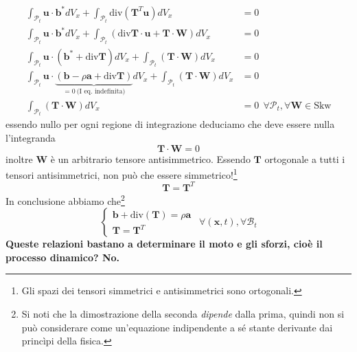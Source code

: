 \documentclass[10pt,a4paper,twoside]{book}
\begin{document}
\begin{equation*}
\begin{aligned}
\int _{\mathcal{P}_{t}}\mathbf{u} \cdotp \mathbf{b}^{*} dV_{x} +\int _{\mathcal{P}_{t}}\mathrm{div}\left(\mathbf{T}^{T}\mathbf{u}\right) dV_{x} & =0\\
\int _{\mathcal{P}_{t}}\mathbf{u} \cdotp \mathbf{b}^{*} dV_{x} +\int _{\mathcal{P}_{t}}(\mathrm{div}\mathbf{T} \cdotp \mathbf{u} +\mathbf{T} \cdotp \mathbf{W}) dV_{x} & =0\\
\int _{\mathcal{P}_{t}}\mathbf{u} \cdotp \left(\mathbf{b}^{*} +\mathrm{div}\mathbf{T}\right) dV_{x} +\int _{\mathcal{P}_{t}}(\mathbf{T} \cdotp \mathbf{W}) dV_{x} & =0\\
\int _{\mathcal{P}_{t}}\mathbf{u} \cdotp \underbrace{(\mathbf{b} -\rho \mathbf{a} +\mathrm{div}\mathbf{T})}_{=0\ \text{(I eq. indefinita)}} dV_{x} +\int _{\mathcal{P}_{t}}(\mathbf{T} \cdotp \mathbf{W}) dV_{x} & =0\\
\int _{\mathcal{P}_{t}}(\mathbf{T} \cdotp \mathbf{W}) dV_{x} & =0\ \ \forall \mathcal{P}_{t} ,\forall \mathbf{W} \in \mathrm{Skw}
\end{aligned}
\end{equation*}
essendo nullo per ogni regione di integrazione deduciamo che deve essere nulla l'integranda
\begin{equation*}
\mathbf{T} \cdotp \mathbf{W} =0
\end{equation*}
inoltre $\mathbf{W}$ è un arbitrario tensore antisimmetrico. Essendo $\mathbf{T}$ ortogonale a tutti i tensori antisimmetrici, non può che essere simmetrico!\footnote{Gli spazi dei tensori simmetrici e antisimmetrici sono ortogonali.}
\begin{equation*}
\boxed{\mathbf{T} =\mathbf{T}^{T}}
\end{equation*}
In conclusione abbiamo che\footnote{Si noti che la dimostrazione della seconda \textit{dipende} dalla prima, quindi non si può considerare come un'equazione indipendente a sé stante derivante dai princìpi della fisica.}
\begin{equation*}
\begin{cases}
\mathbf{b} +\mathrm{div}(\mathbf{T}) =\rho \mathbf{a}\\
\mathbf{T} =\mathbf{T}^{T}
\end{cases} \ \ \forall (\mathbf{x} ,t) ,\forall \mathcal{B}_{t}
\end{equation*}
\textbf{Queste relazioni bastano a determinare il moto e gli sforzi, cioè il processo dinamico? No.}
\end{document}
